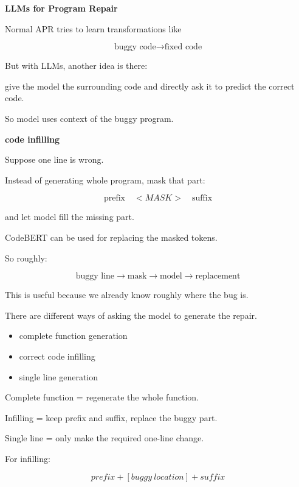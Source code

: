 \documentclass[11pt]{article}
\begin{document}
{\large \textbf{LLMs for Program Repair}}

\vspace{7pt}

Normal APR tries to learn transformations like

\[
\text{buggy code} \rightarrow \text{fixed code}
\]

But with LLMs, another idea is there:

give the model the surrounding code and directly ask
it to predict the correct code.

So model uses context of the buggy program.

\vspace{7pt}

\textbf{code infilling}

Suppose one line is wrong.

Instead of generating whole program, mask that part:

\[
\text{prefix} \quad <MASK> \quad \text{suffix}
\]

and let model fill the missing part.

CodeBERT can be used for replacing the masked tokens.

So roughly:

\[
\text{buggy line}
\rightarrow
\text{mask}
\rightarrow
\text{model}
\rightarrow
\text{replacement}
\]

This is useful because we already know roughly where
the bug is.

\vspace{8pt}

There are different ways of asking the model to
generate the repair.

\begin{itemize}[leftmargin=18pt,itemsep=2pt]
    \item complete function generation
    \item correct code infilling
    \item single line generation
\end{itemize}

Complete function = regenerate the whole function.

Infilling = keep prefix and suffix, replace the
buggy part.

Single line = only make the required one-line change.

\vspace{8pt}

For infilling:

\[
\boxed{
prefix + [buggy\ location] + suffix
}
\]
\end{document}
